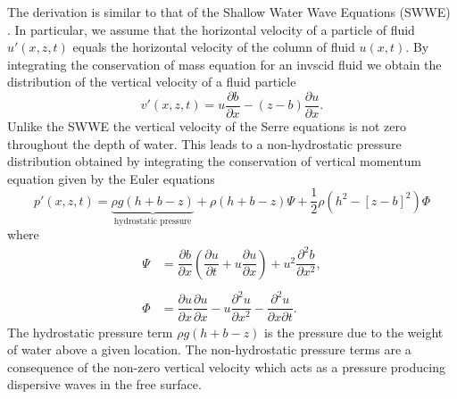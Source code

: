 The derivation is similar to that of the Shallow Water Wave Equations (SWWE) \cite{Liggett-1994}. In particular, we assume that the horizontal velocity of a particle of fluid $u'(x,z,t)$ equals the horizontal velocity of the column of fluid $u(x,t)$. By integrating the conservation of mass equation for an invscid fluid we obtain the distribution of the vertical velocity of a fluid particle \cite{Zoppou-2014}
\begin{equation}
v'(x,z,t) = u \frac{\partial b}{\partial x} - (z - b) \frac{\partial u}{\partial x}.
\label{eqn:VertVelSerre}
\end{equation}
Unlike the SWWE the vertical velocity of the Serre equations is not zero throughout the depth of water. This leads to a non-hydrostatic pressure distribution obtained by integrating the conservation of vertical momentum equation given by the Euler equations \cite{Zoppou-2014}
\begin{equation}
\label{eqn:SerrePress}
 p'(x,z,t) = \underbrace{ \rho g \left(h + b - z\right)}_{\text{hydrostatic pressure}} + \rho \left(h + b - z\right) \Psi + \frac{1}{2} \rho \left(h^2 - \left[z - b \right]^2\right) {\Phi }
\end{equation} 
where
\begin{subequations}
	\begin{align}
	{ \Psi }  &= \dfrac{\partial b}{\partial x}\left(\dfrac{\partial u}{\partial t} + u\dfrac{\partial u}{\partial x} \right)  + u^2\dfrac{\partial^2 b}{\partial x^2}, \label{eqn:SerreeqnPsi} 
	\\ \nonumber \\
	{ \Phi }  &= \dfrac{\partial u }{\partial x} \dfrac{\partial u}{\partial x} -u \dfrac{\partial^2 u}{\partial x^2}  - \dfrac{\partial^2 u}{\partial x \partial t} . \label{eqn:SerreeqnPhi} 
	\end{align}
	\label{eqn:FullSerreNonConVarDef}
\end{subequations}
The hydrostatic pressure term $\rho g \left(h + b - z\right)$ is the pressure due to the weight of water above a given location. The non-hydrostatic pressure terms are a consequence of the non-zero vertical velocity which acts as a pressure producing dispersive waves in the free surface. 

